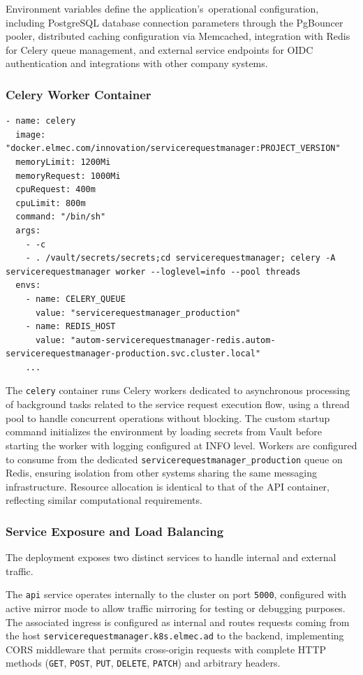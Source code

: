 Environment variables define the application's~operational configuration, including PostgreSQL database connection parameters through the PgBouncer pooler, distributed caching configuration via Memcached, integration with Redis for Celery queue management, and external service endpoints for OIDC authentication and integrations with other company systems.

\subsubsection{Celery Worker Container}

\begin{verbatim}
- name: celery
  image: "docker.elmec.com/innovation/servicerequestmanager:PROJECT_VERSION"
  memoryLimit: 1200Mi
  memoryRequest: 1000Mi
  cpuRequest: 400m
  cpuLimit: 800m
  command: "/bin/sh"
  args:
    - -c
    - . /vault/secrets/secrets;cd servicerequestmanager; celery -A servicerequestmanager worker --loglevel=info --pool threads
  envs:
    - name: CELERY_QUEUE
      value: "servicerequestmanager_production"
    - name: REDIS_HOST
      value: "autom-servicerequestmanager-redis.autom-servicerequestmanager-production.svc.cluster.local"
    ...
\end{verbatim}
The \texttt{celery} container runs Celery workers dedicated to asynchronous processing of background tasks related to the service request execution flow, using a thread pool to handle concurrent operations without blocking. The custom startup command initializes the environment by loading secrets from Vault before starting the worker with logging configured at INFO level.
Workers are configured to consume from the dedicated \texttt{servicerequestmanager\_production} queue on Redis, ensuring isolation from other systems sharing the same messaging infrastructure. Resource allocation is identical to that of the API container, reflecting similar computational requirements.

\subsubsection{Service Exposure and Load Balancing}
The deployment exposes two distinct services to handle internal and external traffic.

The \texttt{api} service operates internally to the cluster on port \texttt{5000}, configured with active mirror mode to allow traffic mirroring for testing or debugging purposes. The associated ingress is configured as internal and routes requests coming from the host \texttt{servicerequestmanager.k8s.elmec.ad} to the backend, implementing CORS middleware that permits cross-origin requests with complete HTTP methods (\texttt{GET}, \texttt{POST}, \texttt{PUT}, \texttt{DELETE}, \texttt{PATCH}) and arbitrary headers.

